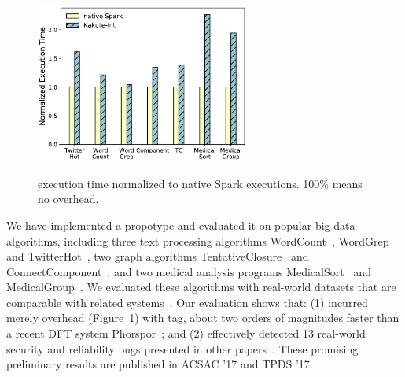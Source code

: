 \begin{figure}
  \vspace{-.1in}
  \includegraphics[width=7cm]{figures/time_overhead.ps}\\
  \vspace{-.3in}
  \caption{\kakute execution time normalized to native Spark executions. 100\% 
means no overhead.}
  \label{fig:scalability}
\end{figure}

 We have implemented a \kakute propotype 
and evaluated it on \appeval popular big-data algorithms, including three text 
processing algorithms WordCount~\cite{spark:example}, 
WordGrep~\cite{newt:socc13} and TwitterHot~\cite{spark:example}, two graph 
algorithms TentativeClosure~\cite{spark:example}
and ConnectComponent~\cite{spark:example}, and two medical analysis programs 
MedicalSort~\cite{pigmix} and MedicalGroup~\cite{pigmix}.
We evaluated these algorithms with 
real-world datasets that are comparable with related 
systems~\cite{vldb16:output, icse16:bigdebug, vldb15:titian}.
Our evaluation shows that: (1) \kakute 
incurred merely \timeavg overhead (Figure~\ref{fig:scalability}) with 
 tag, about two orders of magnitudes faster than a recent DFT 
system Phorspor~\cite{oo14:phosphor}; and (2) \kakute effectively 
detected 13 real-world security and reliability bugs presented in other 
papers~\cite{arthur:dave2013,icse16:bigdebug,airavat:nsdi10}. These promising 
preliminary results are published in ACSAC 
'17 and TPDS '17.












